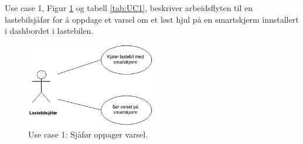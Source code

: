 Use case 1, Figur \ref{fig:UC1} og tabell \ref{tab:UC1}, beskriver arbeidsflyten til en 
lastebilsjåfør for å oppdage et varsel om et løst hjul på en 
smartskjerm innstallert i dashbordet i lastebilen.
\newline
\begin{figure}[H]
	\centering
	\includegraphics[width=0.50\textwidth]{images/UC1.png}
	\caption{Use case 1: Sjåfør oppager varsel.}
	\label{fig:UC1}
\end{figure}

